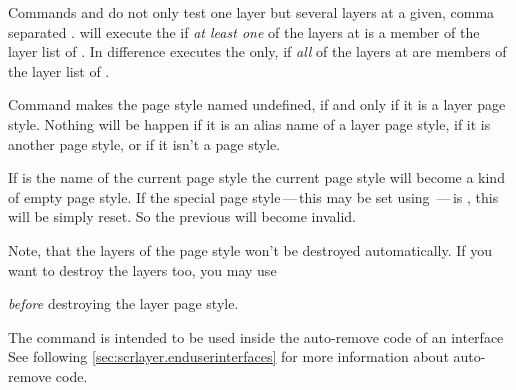 Commands  and  do not
only test one layer but several layers at a given, comma separated
.  will execute the
 if \emph{at least one} of the layers at 
is a member of the layer list of . In difference
 executes the  only, if \emph{all}
of the layers at  are members of the layer list of
.%
%
%

\begin{Declaration}
\end{Declaration}
%
Command  makes the page style named
 undefined, if and only if it is a layer page
style. Nothing will be happen if it is an alias name of a layer page style, if
it is another page style, or if it isn't a page style. 

If  is the name of the current page style the current
page style will become a kind of empty page style. If the special page
style\,---\,this may be set using \,---\,is , this will be simply reset. So the previous
 will become invalid.

Note, that the layers of the page style won't be destroyed automatically. If
you want to destroy the layers too, you may use
\begin{lstcode}
\end{lstcode}
\emph{before} destroying the layer page style.

The command is intended to be used inside the auto-remove code of an interface
See following \ref{sec:scrlayer.enduserinterfaces} for more information about
auto-remove code.%



